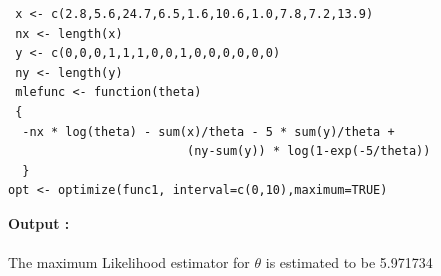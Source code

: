 \documentclass[11pt]{article}
\begin{document}
\begin{enumerate}
\begin{enumerate}
\begin{verbatim}
 x <- c(2.8,5.6,24.7,6.5,1.6,10.6,1.0,7.8,7.2,13.9)
 nx <- length(x)
 y <- c(0,0,0,1,1,1,0,0,1,0,0,0,0,0,0)
 ny <- length(y)
 mlefunc <- function(theta)
 {
  -nx * log(theta) - sum(x)/theta - 5 * sum(y)/theta +
                         (ny-sum(y)) * log(1-exp(-5/theta))
  }
opt <- optimize(func1, interval=c(0,10),maximum=TRUE)
\end{verbatim}




\textbf {Output :}\\
\\The maximum Likelihood estimator for $\theta$ is estimated to be 5.971734\\

\end{enumerate}

\end{enumerate}
\end{document}
